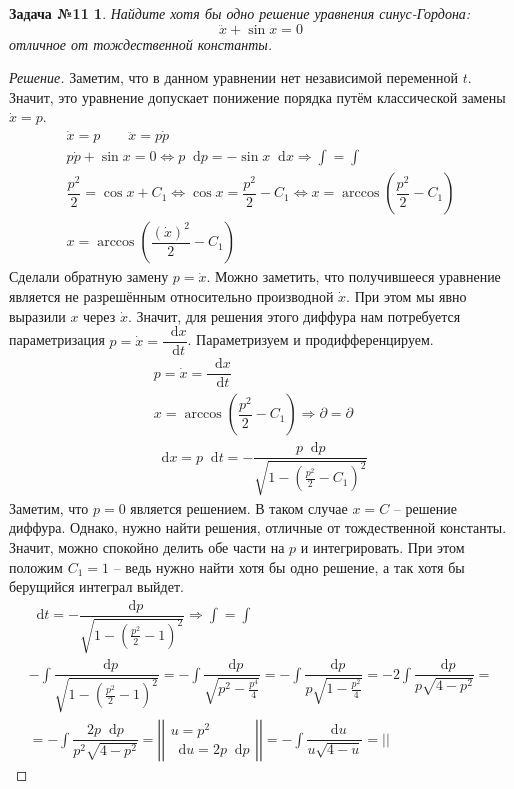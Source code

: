 \documentclass[a4paper,12pt]{article}
\newtheorem*{task11}{Задача №11}
\renewcommand*\d{\mathop{}\!\mathrm{d}}
\newcommand{\dpp}{\dot{p}}
\newcommand{\dx}{\dot{x}}
\newcommand{\ddx}{\ddot{x}}
\newcommand{\bto}{\Longrightarrow}
\newcommand{\ds}{\displaystyle}
\begin{document}
\begin{task11}
	Найдите хотя бы одно решение уравнения синус-Гордона:
	\[\ddx + \sin x = 0\]
	отличное от тождественной константы.
\end{task11}
\begin{proof}[Решение]
	Заметим, что в данном уравнении нет независимой переменной $t$. Значит, это уравнение допускает понижение порядка путём классической замены $\dx = p$.
	\begin{gather*}
	\dx = p\qquad \ddx = p\dpp\\
	p\dpp + \sin x = 0 \iff p\d p = -\sin x  \d x\bto \ds\int = \int\\
	\dfrac{p^2}{2} = \cos x + C_1 \iff \cos x = \dfrac{p^2}{2} - C_1 \iff x = \arccos(\dfrac{p^2}{2} - C_1)\\
	x = \arccos(\dfrac{(\dx)^2}{2} - C_1)
	\end{gather*}
	Сделали обратную замену $p = \dx$. Можно заметить, что получившееся уравнение является не разрешённым относительно производной $\dx$. При этом мы явно выразили $x$ через $\dx$. Значит, для решения этого диффура нам потребуется параметризация $p = \dx = \dfrac{\d x}{\d t}$. Параметризуем и продифференцируем.
	\begin{gather*}
	p = \dx = \dfrac{\d x}{\d t}\\
	x = \arccos(\dfrac{p^2}{2} - C_1) \bto \partial = \partial\\
	\d x = p\d t = -\dfrac{p\d p}{\sqrt{1 - \left(\frac{p^2}{2} - C_1\right)^2}}
	\end{gather*}
	Заметим, что $p = 0$ является решением. В таком случае $x = C$ -- решение диффура. Однако, нужно найти решения, отличные от тождественной константы. Значит, можно спокойно делить обе части на $p$ и интегрировать. При этом положим $C_1 = 1$ -- ведь нужно найти хотя бы одно решение, а так хотя бы берущийся интеграл выйдет.
	\begin{gather*}
	\d t = -\dfrac{\d p}{\sqrt{1 - \left(\frac{p^2}{2} - 1\right)^2}} \bto \ds\int = \int\\
	-\ds\int \dfrac{\d p}{\sqrt{1 - \left(\frac{p^2}{2} - 1\right)^2}} = -\ds\int \dfrac{\d p}{\sqrt{p^2 - \frac{p^4}{4}}} = -\ds\int \dfrac{\d p}{p\sqrt{1 - \frac{p^2}{4}}} = -2\ds\int \dfrac{\d p}{p\sqrt{4 - p^2}} = \\
	= -\ds\int \dfrac{2p\d p}{p^2\sqrt{4 - p^2}} = \left|\left|\begin{gathered}
	u = p^2\\
	\d u = 2p\d p
	\end{gathered}\right|\right| = -\ds\int\dfrac{\d u}{u\sqrt{4 - u}} = \left|\left|\begin{gathered}

\end{gathered}
\end{gather*}
\end{proof}
\end{document}
